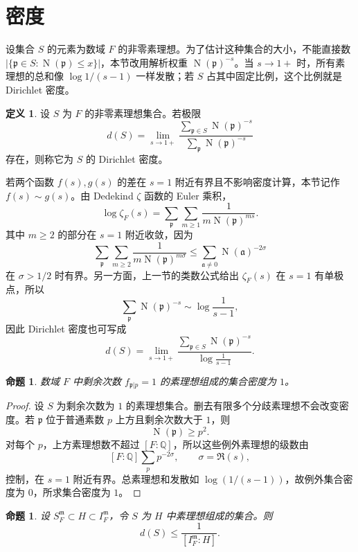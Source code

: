 \documentclass[11pt,a4paper,openany]{ctexbook}
\numberwithin{equation}{chapter}
\newcommand{\Q}{\mathbb{Q}}
\newcommand{\Nm}{\operatorname{N}}
\theoremstyle{plain}
\newtheorem{proposition}[theorem]{命题}
\theoremstyle{definition}
\newtheorem{definition}[theorem]{定义}
\theoremstyle{remark}
\begin{document}
\section{密度}

设集合 $S$ 的元素为数域 $F$ 的非零素理想。为了估计这种集合的大小，不能直接数
$|\{\mathfrak p\in S:\Nm(\mathfrak p)\le x\}|$，本节改用解析权重
\(\Nm(\mathfrak p)^{-s}\)。当 $s\to1+$ 时，所有素理想的总和像
\(\log 1/(s-1)\) 一样发散；若 $S$ 占其中固定比例，这个比例就是 Dirichlet 密度。

\begin{definition}
设 $S$ 为 $F$ 的非零素理想集合。若极限
\[
d(S)=
\lim_{s\to1+}
\frac{\sum_{\mathfrak p\in S}\Nm(\mathfrak p)^{-s}}
{\sum_{\mathfrak p}\Nm(\mathfrak p)^{-s}}
\]
存在，则称它为 $S$ 的 Dirichlet 密度。
\end{definition}

若两个函数 $f(s),g(s)$ 的差在 $s=1$ 附近有界且不影响密度计算，本节记作
$f(s)\sim g(s)$。由 Dedekind $\zeta$ 函数的 Euler 乘积，
\[
\log\zeta_F(s)
=\sum_{\mathfrak p}\sum_{m\ge1}\frac1{m\Nm(\mathfrak p)^{ms}}.
\]
其中 $m\ge2$ 的部分在 $s=1$ 附近收敛，因为
\[
\sum_{\mathfrak p}\sum_{m\ge2}\frac1{m\Nm(\mathfrak p)^{m\sigma}}
\le
\sum_{\mathfrak a\ne0}\Nm(\mathfrak a)^{-2\sigma}
\]
在 $\sigma>1/2$ 时有界。另一方面，上一节的类数公式给出
\(\zeta_F(s)\) 在 $s=1$ 有单极点，所以
\[
\sum_{\mathfrak p}\Nm(\mathfrak p)^{-s}\sim \log\frac1{s-1},
\]
因此 Dirichlet 密度也可写成
\[
d(S)=
\lim_{s\to1+}
\frac{\sum_{\mathfrak p\in S}\Nm(\mathfrak p)^{-s}}
{\log\frac1{s-1}}.
\]

\begin{proposition}
数域 $F$ 中剩余次数 $f_{\mathfrak p|p}=1$ 的素理想组成的集合密度为 $1$。
\end{proposition}

\begin{proof}
设 $S$ 为剩余次数为 $1$ 的素理想集合。删去有限多个分歧素理想不会改变密度。若
$\mathfrak p$ 位于普通素数 $p$ 上方且剩余次数大于 $1$，则
\[
\Nm(\mathfrak p)\ge p^2.
\]
对每个 $p$，上方素理想数不超过 $[F:\Q]$，所以这些例外素理想的级数由
\[
[F:\Q]\sum_p p^{-2\sigma},\qquad \sigma=\Re(s),
\]
控制，在 $s=1$ 附近有界。总素理想和发散如 $\log(1/(s-1))$，故例外集合密度为 $0$，所求集合密度为 $1$。
\end{proof}

\begin{proposition}
设 $S_F^{\mathfrak m}\subset H\subset I_F^{\mathfrak m}$，令 $S$ 为 $H$ 中素理想组成的集合。则
\[
d(S)\le \frac1{[I_F^{\mathfrak m}:H]}.
\]
\end{proposition}
\end{document}
